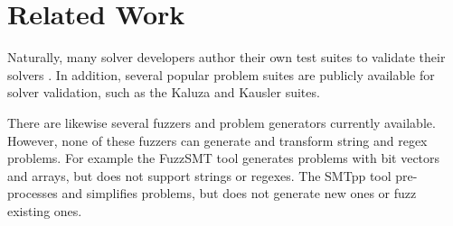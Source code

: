 \section{Related Work}

    Naturally, many solver developers author their own test suites to validate their solvers 
    \cite{cvc4-tests} \cite{z3str3-tests} \cite{z3str2-tests}. 
    In addition, several popular problem suites are publicly available for solver validation, 
    such as the Kaluza \cite{kaluza} and Kausler \cite{kausler} suites.

    There are likewise several fuzzers and problem generators currently available.
    However, none of these fuzzers can generate and transform string and regex problems. 
    For example the FuzzSMT\cite{fuzzsmt} tool generates \smt{} problems with bit vectors and arrays, 
    but does not support strings or regexes. 
    The SMTpp\cite{smtpp} tool pre-processes and simplifies problems, but does not generate new ones or fuzz existing ones.

